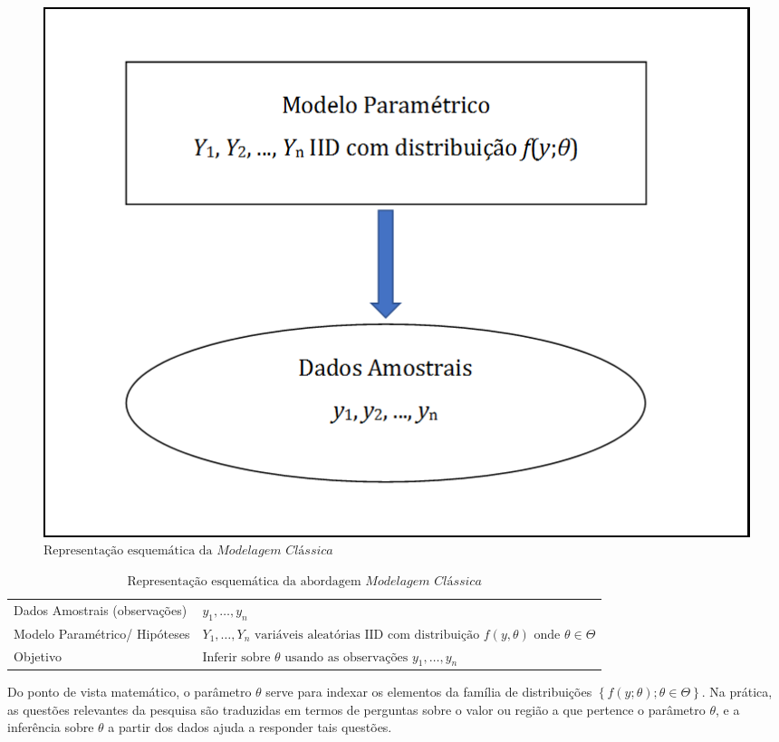 \documentclass[
  12pt,
  brazilian,
]{book}
\theoremstyle{definition}
\theoremstyle{definition}
\theoremstyle{definition}
\theoremstyle{definition}
\theoremstyle{remark}
\begin{document}
\begin{figure}

{\centering \includegraphics{Figuras/Figura2.1} 

}

\caption{$\text{Representação esquemática da }\textit{Modelagem Clássica}$}\label{fig:modclas}
\end{figure}

\begin{table}[H]

\caption{\label{tab:modelclass}$\text{Representação esquemática da abordagem }\textit{Modelagem Clássica}$}
\centering
\begin{tabular}[t]{>{\raggedright\arraybackslash}p{4.5cm}l}
\toprule
Dados Amostrais (observações) & $y_1, \ldots, y_n$\\
Modelo Paramétrico/ Hipóteses & $Y_1, \ldots , Y_n 
     \text{ variáveis aleatórias IID com distribuição } f(y,\theta) \text{ onde } \theta \in \Theta$\\
Objetivo & $\text{Inferir sobre } \theta 
     \text{ usando as observações } y_1, \ldots, y_n$\\
\bottomrule
\end{tabular}
\end{table}

Do ponto de vista matemático, o parâmetro \(\theta\) serve para indexar os
elementos da família de distribuições \(\left\{f\left( y;\theta \right);\theta \in \Theta \right\}\).
Na prática, as questões relevantes da pesquisa são traduzidas em termos de perguntas sobre o valor
ou região a que pertence o parâmetro \(\theta\), e a inferência sobre \(\theta\) a partir dos dados ajuda a responder tais questões.
\end{document}
